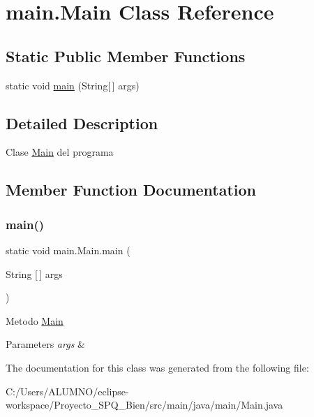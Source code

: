 \hypertarget{classmain_1_1_main}{}\section{main.\+Main Class Reference}
\label{classmain_1_1_main}
\subsection*{Static Public Member Functions}
\begin{DoxyCompactItemize}
\item 
static void \hyperlink{classmain_1_1_main_a896f71a651b705304693dbfe0cf9ca63}{main} (String\mbox{[}$\,$\mbox{]} args)
\end{DoxyCompactItemize}


\subsection{Detailed Description}
Clase \hyperlink{classmain_1_1_main}{Main} del programa 

\subsection{Member Function Documentation}
\mbox{\label{classmain_1_1_main_a896f71a651b705304693dbfe0cf9ca63}} 
\subsubsection{\texorpdfstring{main()}{main()}}
{\footnotesize\ttfamily static void main.\+Main.\+main (\begin{DoxyParamCaption}\item[{String \mbox{[}$\,$\mbox{]}}]{args }\end{DoxyParamCaption})\hspace{0.3cm}{\ttfamily [static]}}

Metodo \hyperlink{classmain_1_1_main}{Main} 
\begin{DoxyParams}{Parameters}
{\em args} & \\
\hline
\end{DoxyParams}


The documentation for this class was generated from the following file\+:\begin{DoxyCompactItemize}
\item 
C\+:/\+Users/\+A\+L\+U\+M\+N\+O/eclipse-\/workspace/\+Proyecto\+\_\+\+S\+P\+Q\+\_\+Bien/src/main/java/main/Main.\+java\end{DoxyCompactItemize}
